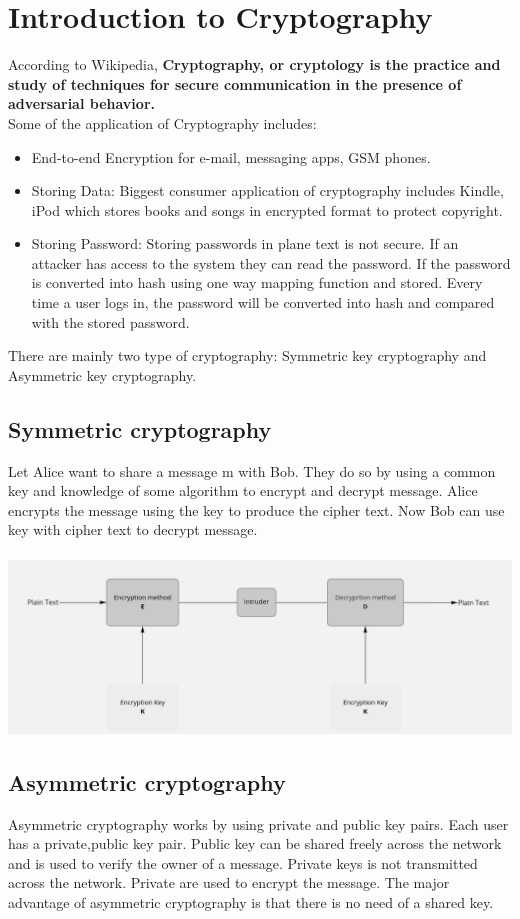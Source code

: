 \documentclass[12pt,a4paper]{report}
\begin{document}
\section{Introduction to Cryptography}
According to Wikipedia, \textbf{Cryptography, or cryptology is the practice and study of techniques for secure communication in the presence of adversarial behavior.}
\\Some of the application of Cryptography includes:
\begin{itemize}
	\item End-to-end Encryption for e-mail, messaging apps, GSM phones.
	\item Storing Data: Biggest consumer application of cryptography includes Kindle, iPod which stores books and songs in encrypted format to protect copyright.
	\item Storing Password: Storing passwords in plane text is not secure. If an attacker has access to the system they can read the password. If the password is converted into hash using one way mapping function and stored. Every time a user logs in, the password will be converted into hash and compared with the stored password.
\end{itemize}
There are mainly two type of cryptography: Symmetric key cryptography and Asymmetric key cryptography. 	
\cleardoublepage

	
\subsection{Symmetric cryptography}
Let Alice want to share a message m with Bob. They do so by using a common key and knowledge of some algorithm to encrypt and decrypt message. Alice encrypts the message using the key to produce the cipher text. Now Bob can use key with cipher text to decrypt message.  \\\\
\includegraphics[scale=0.4]{sym}
\subsection{Asymmetric cryptography}
Asymmetric cryptography works by using private and public key pairs.
Each user has a private,public key pair. Public key can be shared freely across the network and is used to verify the owner of a message.
Private keys is not transmitted across the network. Private are used to encrypt the message. The major advantage of asymmetric cryptography is that there is no need of a shared key. 
\cleardoublepage	
\end{document}
